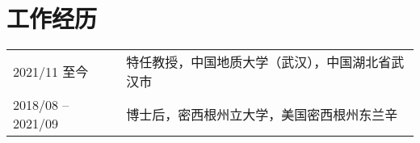 \section*{工作经历}
\begin{tabular}{p{} p{}}
2021/11 至今 & 特任教授，中国地质大学（武汉），中国湖北省武汉市 \\
2018/08 -- 2021/09 & 博士后，密西根州立大学，美国密西根州东兰辛 \\
\end{tabular}
